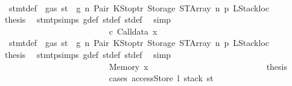 \begin{isabellebody}
\ \ \ \ \ \ \ \ \ \ \ \ \ \ \ \ \ \ \ \ \ \ \ \ \isamarkupfalse%
\ {}{\isacharparenleft}{\kern0pt}{}{\isacharparenright}{\kern0pt}\ stmt{\isacharunderscore}{\kern0pt}def\ {\isacharbackquoteopen}{\isasymnot}\ gas\ st\ {\isasymle}\ g{\isacharbackquoteclose}\ n\ Pair\ KStoptr\ Storage\ STArray\ n{}\ p{}\ LStackloc\ \isamarkupfalse%
\ {\isacharquery}{\kern0pt}thesis\ \isamarkupfalse%
\ stmt{\isachardot}{\kern0pt}psimps{\isacharparenleft}{\kern0pt}{}{\isacharparenright}{\kern0pt}\ g{\isacharunderscore}{\kern0pt}def\ st{\isacharprime}{\kern0pt}{\isacharunderscore}{\kern0pt}def\ st{\isacharprime}{\kern0pt}{\isacharprime}{\kern0pt}{\isacharunderscore}{\kern0pt}def\ \isamarkupfalse%
\ simp\isanewline
\ \ \ \ \ \ \ \ \ \ \ \ \ \ \ \ \ \ \ \ \ \ \isamarkupfalse%
\isanewline
\ \ \ \ \ \ \ \ \ \ \ \ \ \ \ \ \ \ \ \ \ \ \ \ \isamarkupfalse%
\ c{}{\isacharcolon}{\kern0pt}\ {\isacharparenleft}{\kern0pt}Calldata\ x{}{\isacharparenright}{\kern0pt}\isanewline
\ \ \ \ \ \ \ \ \ \ \ \ \ \ \ \ \ \ \ \ \ \ \ \ \isamarkupfalse%
\ {}{\isacharparenleft}{\kern0pt}{}{\isacharparenright}{\kern0pt}\ stmt{\isacharunderscore}{\kern0pt}def\ {\isacharbackquoteopen}{\isasymnot}\ gas\ st\ {\isasymle}\ g{\isacharbackquoteclose}\ n\ Pair\ KStoptr\ Storage\ STArray\ n{}\ p{}\ LStackloc\ \isamarkupfalse%
\ {\isacharquery}{\kern0pt}thesis\ \isamarkupfalse%
\ stmt{\isachardot}{\kern0pt}psimps{\isacharparenleft}{\kern0pt}{}{\isacharparenright}{\kern0pt}\ g{\isacharunderscore}{\kern0pt}def\ st{\isacharprime}{\kern0pt}{\isacharunderscore}{\kern0pt}def\ st{\isacharprime}{\kern0pt}{\isacharprime}{\kern0pt}{\isacharunderscore}{\kern0pt}def\ \isamarkupfalse%
\ simp\isanewline
\ \ \ \ \ \ \ \ \ \ \ \ \ \ \ \ \ \ \ \ \ \ \isamarkupfalse%
\isanewline
\ \ \ \ \ \ \ \ \ \ \ \ \ \ \ \ \ \ \ \ \ \ \ \ \isamarkupfalse%
\ {\isacharparenleft}{\kern0pt}Memory\ x{}{\isacharparenright}{\kern0pt}\isanewline
\ \ \ \ \ \ \ \ \ \ \ \ \ \ \ \ \ \ \ \ \ \ \ \ \isamarkupfalse%
\ \isamarkupfalse%
\ {\isacharquery}{\kern0pt}thesis\isanewline
\ \ \ \ \ \ \ \ \ \ \ \ \ \ \ \ \ \ \ \ \ \ \ \ \isamarkupfalse%
\ {\isacharparenleft}{\kern0pt}cases\ {\isachardoublequoteopen}accessStore\ l\ {\isacharparenleft}{\kern0pt}stack\ st{\isacharprime}{\kern0pt}{\isacharprime}{\kern0pt}{\isacharprime}{\kern0pt}{\isacharparenright}{\kern0pt}{\isachardoublequoteclose}{\isacharparenright}{\kern0pt}\isanewline

\end{isabellebody}
